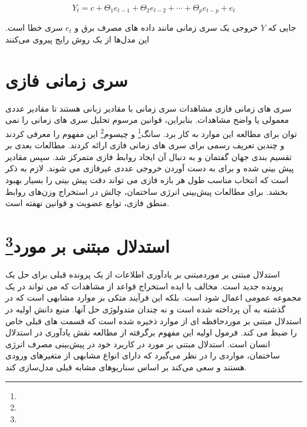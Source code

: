     \begin{equation}\label{eq:q}
        Y_t = c + \Theta_1 e_{t-1} + \Theta_2 e_{t-2} + \cdots + \Theta_p e_{t-p} + e_t
    \end{equation}

    جایی که $Y$ خروجی یک سری زمانی مانند داده های مصرف برق و $e_t$ سری خطا است. این مدل‌ها از یک روش رایج پیروی می‌کنند
\section{سری زمانی فازی}
سری های زمانی فازی مشاهدات سری زمانی با مقادیر زبانی هستند تا مقادیر عددی معمولی یا واضح مشاهدات.
 بنابراین، قوانین مرسوم تحلیل سری های زمانی را نمی توان برای مطالعه این موارد به کار برد. سانگ\footnote{} و چیسوم\footnote{} \cite{song1993fuzzy} این مفهوم را معرفی کردند و چندین تعریف رسمی برای سری های زمانی فازی ارائه کردند. 
 مطالعات بعدی بر تقسیم بندی جهان گفتمان و به دنبال آن ایجاد روابط فازی متمرکز شد. سپس مقادیر پیش بینی شده و برای به دست آوردن خروجی عددی غیرفازی می شوند. 
 لازم به ذکر است که انتخاب مناسب طول هر بازه فازی می تواند دقت پیش بینی را بسیار بهبود بخشد.
  برای مطالعات پیش‌بینی انرژی ساختمان، چالش در استخراج وزن‌های روابط منطق فازی، توابع عضویت و قوانین نهفته است.
\section{استدلال مبتنی بر مورد\footnote{}}

استدلال مبتنی بر مورد\footnotemark[5] مبتنی بر یادآوری اطلاعات از یک پرونده قبلی برای حل یک پرونده جدید است. مخالف با ایده استخراج قواعد از مشاهدات که می تواند در یک مجموعه عمومی اعمال شود است.
 بلکه این فرآیند متکی بر موارد مشابهی است 
 که در گذشته به آن پرداخته شده است و نه چندان متدولوژی حل آنها.
  منبع دانش اولیه در استدلال مبتنی بر مورد\footnotemark[5] حافظه ای از موارد ذخیره شده است که قسمت های قبلی خاص را ضبط می کند\cite{leake1996cbr}. 
 فرمول اولیه این مفهوم برگرفته از مطالعه نقش یادآوری در استدلال انسان است\cite{schank1983dynamic}. 
 استدلال مبتنی بر مورد در کاربرد خود در پیش‌بینی مصرف انرژی ساختمان، مواردی را در نظر می‌گیرد که دارای انواع مشابهی از متغیرهای ورودی هستند
  و سعی می‌کند بر اساس سناریوهای مشابه قبلی مدل‌سازی کند.

